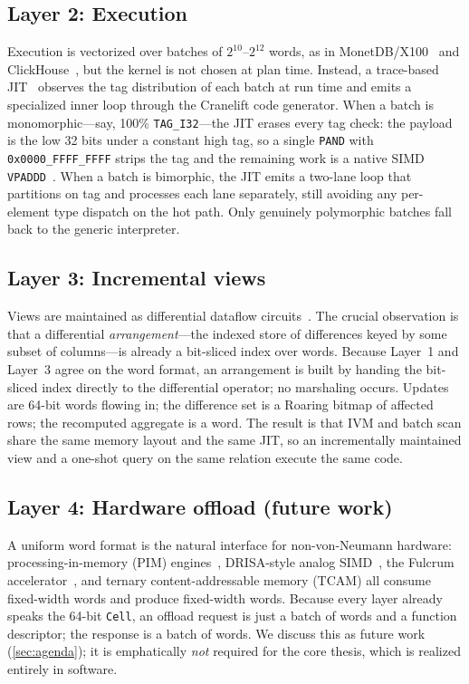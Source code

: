 \documentclass[10pt]{article}
\begin{document}
\subsection{Layer 2: Execution}
Execution is vectorized over batches of $2^{10}$--$2^{12}$ words, as in
MonetDB/X100~\citep{boncz2005monetdb} and
ClickHouse~\citep{schulze2024clickhouse}, but the kernel is not chosen
at plan time. Instead, a trace-based JIT~\citep{gal2009trace} observes
the tag distribution of each batch at run time and emits a specialized
inner loop through the Cranelift code generator. When a batch is
monomorphic---say, 100\% \texttt{TAG\_I32}---the JIT erases every tag
check: the payload is the low 32 bits under a constant high tag, so a
single \texttt{PAND} with \texttt{0x0000\_FFFF\_FFFF} strips the tag
and the remaining work is a native SIMD
\texttt{VPADDD}~\citep{polychroniou2015arithmetic,willhalm2009simd}.
When a batch is bimorphic, the JIT emits a two-lane loop that partitions
on tag and processes each lane separately, still avoiding any
per-element type dispatch on the hot path. Only genuinely polymorphic
batches fall back to the generic interpreter.

\subsection{Layer 3: Incremental views}
Views are maintained as differential dataflow
circuits~\citep{mcsherry2013differential,murray2013naiad,budiu2023dbsp}.
The crucial observation is that a differential \emph{arrangement}---the
indexed store of differences keyed by some subset of columns---is
already a bit-sliced index over words. Because Layer~1 and Layer~3
agree on the word format, an arrangement is built by handing the
bit-sliced index directly to the differential operator; no marshaling
occurs. Updates are 64-bit words flowing in; the difference set is a
Roaring bitmap of affected rows; the recomputed aggregate is a word.
The result is that IVM and batch scan share the same memory layout and
the same JIT, so an incrementally maintained view and a one-shot query
on the same relation execute the same code.

\subsection{Layer 4: Hardware offload (future work)}
A uniform word format is the natural interface for non-von-Neumann
hardware: processing-in-memory (PIM)
engines~\citep{gomez2023benchmarking}, DRISA-style analog
SIMD~\citep{li2017drisa}, the Fulcrum accelerator~\citep{seshadri2017fulcrum},
and ternary content-addressable memory (TCAM) all consume fixed-width
words and produce fixed-width words. Because every layer already speaks
the 64-bit \texttt{Cell}, an offload request is just a batch of words
and a function descriptor; the response is a batch of words. We discuss
this as future work (\cref{sec:agenda}); it is emphatically \emph{not}
required for the core thesis, which is realized entirely in software.
\end{document}
